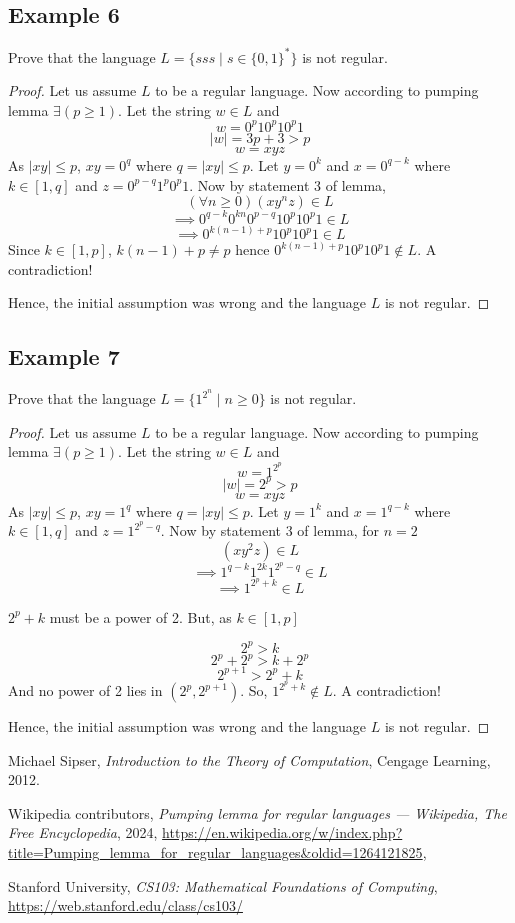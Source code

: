 \documentclass{article}
\begin{document}
\subsection{Example 6}

Prove that the language $L=\{sss\mid s\in \{ 0,1\}^*\}$ is not regular.

\begin{proof}
Let us assume $L$ to be a regular language. Now according to pumping lemma $\exists(p\ge1)$.
Let the string $w\in L$ and $$w=0^p10^p10^p1$$ $$\mid w\mid=3p+3>p $$ $$w=xyz$$
As $\mid xy\mid\le p$, $xy=0^q$ where $q=\mid xy\mid\le p$. Let $y=0^k$ and $x=0^{q-k}$ where $k\in[1,q]$ and $z=0^{p-q}1^p0^p1$.
Now by statement 3 of lemma, 
$$(\forall n\ge0)(xy^nz)\in L$$
$$\implies 0^{q-k}0^{kn}0^{p-q}10^p10^p1\in L$$
$$\implies 0^{k(n-1)+p}10^p10^p1\in L$$
Since $k\in[1,p]$, $k(n-1)+p\ne p$ hence $0^{k(n-1)+p}10^p10^p1\notin L$. A contradiction!

Hence, the initial assumption was wrong and the language $L$ is not regular.
\end{proof}

\subsection{Example 7}

Prove that the language $L=\{1^{2^n}\mid n\ge 0\}$ is not regular.

\begin{proof}
Let us assume $L$ to be a regular language. Now according to pumping lemma $\exists(p\ge1)$.
Let the string $w\in L$ and $$w=1^{2^p}$$ $$\mid w\mid=2^p>p $$ $$w=xyz$$
As $\mid xy\mid\le p$, $xy=1^q$ where $q=\mid xy\mid\le p$. Let $y=1^k$ and $x=1^{q-k}$ where $k\in[1,q]$ and $z=1^{2^p-q}$.
Now by statement 3 of lemma, for $n=2$
$$(xy^2z)\in L$$
$$\implies 1^{q-k}1^{2k}1^{2^p-q}\in L$$
$$\implies 1^{2^p+k}\in L$$                            

$2^p+k$ must be a power of 2. But, as $k\in[1,p]$

$$2^p>k$$
$$2^p+2^p>k+2^p$$
$$2^{p+1}>2^p+k$$
And no power of 2 lies in $(2^p,2^{p+1})$. So, $1^{2^p+k}\notin L$. A contradiction!

Hence, the initial assumption was wrong and the language $L$ is not regular.
\end{proof}

\begin{thebibliography}{9}

Michael Sipser,
\textit{Introduction to the Theory of Computation},
Cengage Learning, 2012.

Wikipedia contributors,
\textit{Pumping lemma for regular languages --- Wikipedia, The Free Encyclopedia},
2024,
\url{https://en.wikipedia.org/w/index.php?title=Pumping_lemma_for_regular_languages&oldid=1264121825},

Stanford University,
\textit{CS103: Mathematical Foundations of Computing},
\url{https://web.stanford.edu/class/cs103/}

\end{thebibliography}
\end{document}

